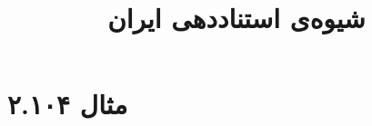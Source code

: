 \documentclass[a4paper,10pt]{article}
\begin{document}
\title{شیوه‌ی استناددهی ایران}
\author{}
\date{}
\maketitle



\section*{مثال ۲.۱۰۴}

\cite{صفا1368}\\
\\






\end{document}
